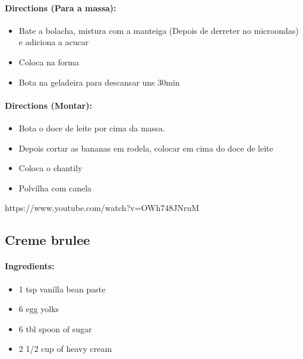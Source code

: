 \documentclass{article}
\begin{document}
\paragraph{Directions (Para a massa):}
\begin{itemize}
	\item Bate a bolacha, mistura com a manteiga (Depois de derreter no microondas) e adiciona a acucar
	\item Coloca na forma
	\item Bota na geladeira para descansar uns 30min
\end{itemize}

\paragraph{Directions (Montar):}
\begin{itemize}
	\item Bota o doce de leite por cima da massa.
	\item Depois cortar as bananas em rodela, colocar em cima do doce de leite
	\item Coloca o chantily
	\item Polvilha com canela
\end{itemize}




https://www.youtube.com/watch?v=OWh748JNruM

\subsection{Creme brulee}

\paragraph{Ingredients:}

\begin{itemize}
\item 1 tsp vanilla bean paste
\item 6 egg yolks
\item 6 tbl spoon of sugar
\item 2 1/2 cup of heavy cream
\end{itemize}
\end{document}
